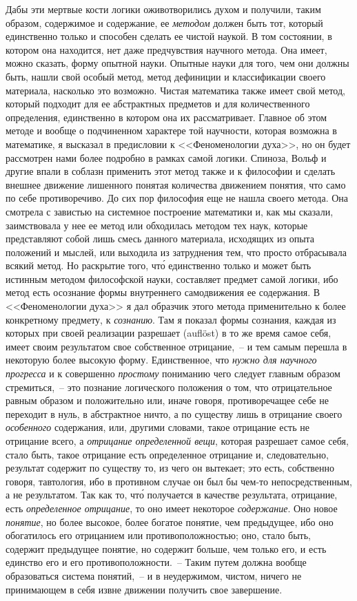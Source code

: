 Дабы эти мертвые кости логики оживотворились духом
и получили, таким образом, содержимое и содержание,
ее \emph{методом} должен быть тот, который единственно
только и способен сделать ее чистой наукой. В том состоянии,
в котором она находится, нет даже предчувствия
научного метода. Она имеет, можно сказать, форму опытной
науки. Опытные науки для того, чем они должны
быть, нашли свой особый метод, метод дефиниции и классификации
своего материала, насколько это возможно. Чистая
математика также имеет свой метод, который подходит
для ее абстрактных предметов и для количественного
определения, единственно в котором она их рассматривает.
Главное об этом методе и вообще о подчиненном
характере той научности, которая возможна в математике,
я высказал в предисловии к <<Феноменологии духа>>,
но он будет рассмотрен нами более подробно в рамках
самой логики. Спиноза, Вольф и другие впали в соблазн
применить этот метод также и к философии и сделать
внешнее движение лишенного понятая количества движением
понятия, что само по себе противоречиво. До сих
пор философия еще не нашла своего метода. Она смотрела
с завистью на системное построение математики и,
как мы сказали, заимствовала у нее ее метод или обходилась
методом тех наук, которые представляют собой
лишь смесь данного материала, исходящих из опыта положений
и мыслей, или выходила из затруднения тем,
что просто отбрасывала всякий метод. Но раскрытие того,
чт\'о единственно только и может быть истинным методом
философской науки, составляет предмет самой логики,
ибо метод есть осознание формы внутреннего самодвижения
ее содержания. В <<Феноменологии духа>> я дал
образчик этого метода применительно к более конкретному
предмету, к \emph{сознанию}\footnotemark{}. Там я показал формы сознания,
каждая из которых при своей реализации разрешает
(auflöst) в то же время самое себя, имеет своим
результатом свое собственное отрицание,~-- и тем самым
перешла в некоторую более высокую форму. Единственное,
что \emph{нужно для научного прогресса} и к совершенно
\emph{простому} пониманию чего следует главным образом стремиться,~--
это познание логического положения о том, что
отрицательное равным образом и положительно или,
иначе говоря, противоречащее себе не переходит в нуль,
в абстрактное ничто, а по существу лишь в отрицание
своего \emph{особенного} содержания, или, другими словами,
такое отрицание есть не отрицание всего, а \emph{отрицание
определенной вещи}, которая разрешает самое себя, стало
быть, такое отрицание есть определенное отрицание и,
следовательно, результат содержит по существу то, из
чего он вытекает; это есть, собственно говоря, тавтология,
ибо в противном случае он был бы чем-то непосредственным,
а не результатом. Так как то, чт\'о получается
в качестве результата, отрицание, есть \emph{определенное отрицание},
то оно имеет некоторое \emph{содержание}. Оно новое
\emph{понятие}, но более высокое, более богатое понятие, чем
предыдущее, ибо оно обогатилось его отрицанием или противоположностью;
оно, стало быть, содержит предыдущее
понятие, но содержит больше, чем только его, и есть
единство его и его противоположности.~-- Таким путем
должна вообще образоваться система понятий,~-- и в неудержимом,
чистом, ничего не принимающем в себя
извне движении получить свое завершение.

